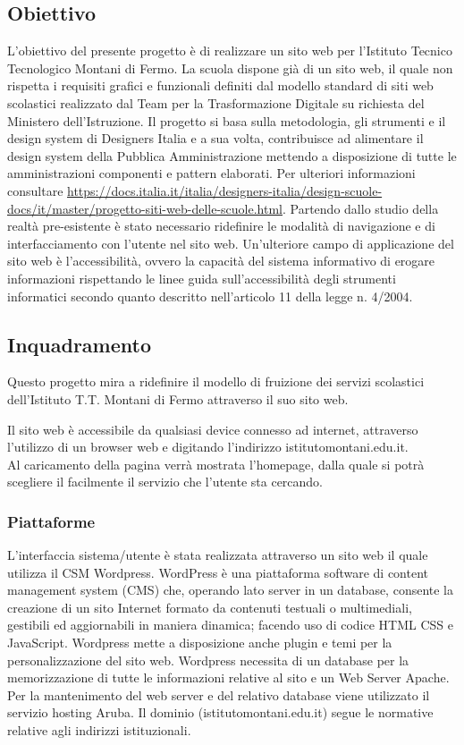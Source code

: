 \documentclass{article}
\begin{document}
	 \subsection{\textbf{Obiettivo}} 
	\flushleft
	\normalsize
	L'obiettivo del presente progetto è di realizzare un sito web per l'Istituto Tecnico Tecnologico Montani di Fermo. La scuola dispone già di un sito web, il quale non rispetta i requisiti grafici e funzionali definiti dal modello standard di siti web scolastici realizzato dal Team per la Trasformazione Digitale su richiesta del Ministero dell'Istruzione. Il progetto si basa sulla metodologia, gli strumenti e il design system di Designers Italia e a sua volta, contribuisce ad alimentare il design system della Pubblica Amministrazione mettendo a disposizione di tutte le amministrazioni componenti e pattern elaborati. Per ulteriori informazioni consultare \url{https://docs.italia.it/italia/designers-italia/design-scuole-docs/it/master/progetto-siti-web-delle-scuole.html}. Partendo dallo studio della realtà pre-esistente è stato necessario ridefinire le modalità di navigazione e di interfacciamento con l'utente nel sito web. Un'ulteriore campo di applicazione del sito web è l'accessibilità, ovvero la capacità del sistema informativo di erogare informazioni rispettando le linee guida sull’accessibilità degli strumenti informatici secondo quanto descritto nell’articolo 11 della legge n. 4/2004.

	\subsection{\textbf{Inquadramento}}
	Questo progetto mira a ridefinire il modello di fruizione dei servizi scolastici dell'Istituto T.T. Montani di Fermo attraverso il suo sito web.
	
	Il sito web è accessibile da qualsiasi device connesso ad internet, attraverso l'utilizzo di un browser web e digitando l'indirizzo istitutomontani.edu.it.\\
	Al caricamento della pagina verrà mostrata l'homepage, dalla quale si potrà scegliere il facilmente il servizio che l'utente sta cercando. 
	
	\subsubsection{\textbf{Piattaforme}}
	L’interfaccia sistema/utente è stata realizzata attraverso un sito web il quale utilizza il CSM Wordpress. WordPress è una piattaforma software di content management system (CMS) che, operando lato server in un database, consente la creazione di un sito Internet formato da contenuti testuali o multimediali, gestibili ed aggiornabili in maniera dinamica; facendo uso di codice HTML CSS e JavaScript. Wordpress mette a disposizione anche plugin e temi per la personalizzazione del sito web. Wordpress necessita di un database per la memorizzazione di tutte le informazioni relative al sito e un Web Server Apache. Per la mantenimento del web server e del relativo database viene utilizzato il servizio hosting Aruba. Il dominio (istitutomontani.edu.it) segue le normative relative agli indirizzi istituzionali.
	
\end{document}
